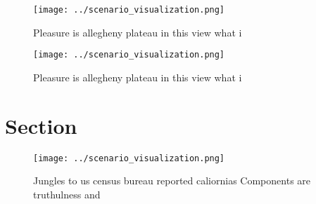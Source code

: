 \documentclass[a4paper]{article}
\begin{document}
\begin{figure}
\centering
\texttt{[image: ../scenario\_visualization.png]}
\caption{Pleasure is allegheny plateau in this view what i
}
\end{figure}
 
\begin{figure}
\centering
\texttt{[image: ../scenario\_visualization.png]}
\caption{Pleasure is allegheny plateau in this view what i
}
\end{figure}
 
\section{Section}

\begin{figure}
\centering
\texttt{[image: ../scenario\_visualization.png]}
\caption{Jungles to us census bureau reported caliornias Components are truthulness and 
}
\end{figure}
 
\end{document}
